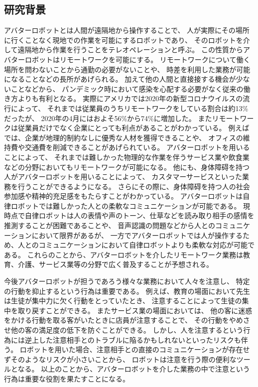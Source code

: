 \documentclass{kuisthesis}
\begin{document}
\subsection{研究背景} %
アバターロボットとは人間が遠隔地から操作することで、
人が実際にその場所に行くことなく現地での作業を可能にするロボットであり、
そのロボットを介して遠隔地から作業を行うことをテレオペレーションと呼ぶ。
この性質からアバターロボットはリモートワークを可能にする。
リモートワークについて働く場所を問わないことから通勤の必要がないことや、
時差を利用した業務が可能になることなどの長所があげられる。
加えて他の人間と直接接する機会が少ないことなどから、
パンデミック時において感染を心配する必要がなく従来の働き方よりも有利となる。
実際にアメリカでは2020年の新型コロナウイルスの流行によって、
それまでは従業員のうちリモートワークをしている割合は約13\%だったが、
2020年の4月にはおよそ56\%から74\%に増加した\cite{ozimek2020future}。
またリモートワークは従業員だけでなく企業にとっても利点があることがわかっている。
例えば\cite{FERREIRA202170}では、企業が地理的制約なしに優秀な人材を獲得できることや、
オフィスの維持費や交通費を削減できることがあげられている。
アバターロボットを用いることによって、
それまでは難しかった物理的な作業を伴うサービス業や飲食業などの分野においてもリモートワークが可能になる。
他にも、身体障碍を持つ人がアバターロボットを用いることによって、
カスタマーサービスといった業務を行うことができるようになる。
さらにその際に、身体障碍を持つ人の社会参加感や精神的充足感をもたらすことがわかっている\cite{takeuchi2020avatar}。
アバターロボットは自律ロボットでは難しかった人との柔軟なコミュニケーションが可能である。
現時点で自律ロボットは人の表情や声のトーン、仕草などを読み取り相手の感情を推測することが困難であることや、
音声認識の問題などから人とのコミュニケーションにおいて限界があるが、
一方でアバターロボットでは人が操作するため、人とのコミュニケーションにおいて自律ロボットよりも柔軟な対応が可能である。
これらのことから、アバターロボットを介したリモートワーク業務は教育、介護、サービス業等の分野で広く普及することが予想される。

今後アバターロボットが担うであろう様々な業務において人々を注意し、
特定の行動を抑止するという行為は重要である。
例えば、教育の場面において先生は生徒が集中力に欠く行動をとっていたとき、
注意することによって生徒の集中を取り戻すことができる。
またサービス業の場面においては、
他の客に迷惑をかける行動を取る客がいたときに店員が注意することで、
その行動をやめさせ他の客の満足度の低下を防ぐことができる。
しかし、人を注意するという行為には逆上した注意相手とのトラブルに陥るかもしれないといったリスクも伴う。
ロボットを用いた場合、注意相手との直接のコミュニケーションが存在せずそのようなリスクが小さいことから、
ロボットは注意を行う際の便利なツールとなる。
以上のことから、アバターロボットを介した業務の中で注意という行為は重要な役割を果たすことになる。
\end{document}
